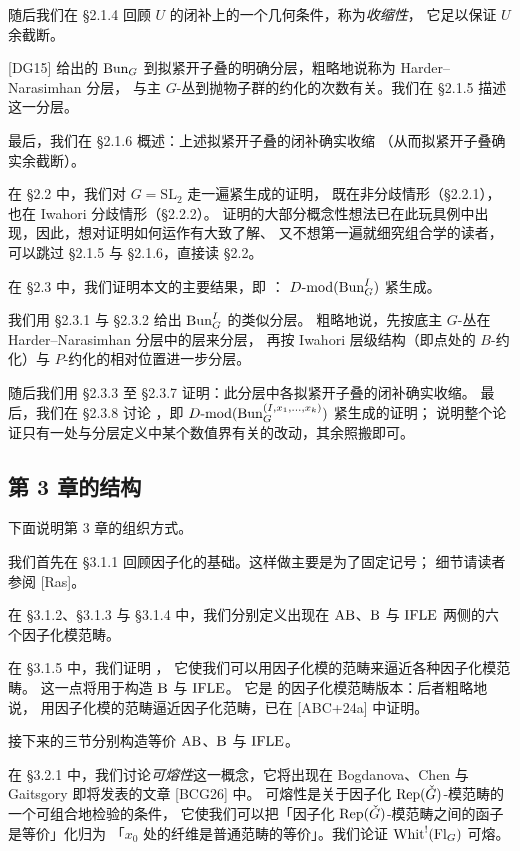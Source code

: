 随后我们在 §2.1.4 回顾 $U$ 的闭补上的一个几何条件，称为\emph{收缩性}，
它足以保证 $U$ 余截断。

[DG15] 给出的 $\mathrm{Bun}_G$ 到拟紧开子叠的明确分层，粗略地说称为 Harder–Narasimhan 分层，
与主 $G$-丛到抛物子群的约化的次数有关。我们在 §2.1.5 描述这一分层。

最后，我们在 §2.1.6 概述：上述拟紧开子叠的闭补确实收缩
（从而拟紧开子叠确实余截断）。

在 §2.2 中，我们对 $G=\mathrm{SL}_2$ 走一遍紧生成的证明，
既在非分歧情形（§2.2.1），也在 Iwahori 分歧情形（§2.2.2）。
证明的大部分概念性想法已在此玩具例中出现，因此，想对证明如何运作有大致了解、
又不想第一遍就细究组合学的读者，可以跳过 §2.1.5 与 §2.1.6，直接读 §2.2。

在 §2.3 中，我们证明本文的主要结果，即 ：
$D\text{-}\mathrm{mod}(\mathrm{Bun}^I_G)$ 紧生成。

我们用 §2.3.1 与 §2.3.2 给出 $\mathrm{Bun}^I_G$ 的类似分层。
粗略地说，先按底主 $G$-丛在 Harder–Narasimhan 分层中的层来分层，
再按 Iwahori 层级结构（即点处的 $B$-约化）与 $P$-约化的相对位置进一步分层。

随后我们用 §2.3.3 至 §2.3.7 证明：此分层中各拟紧开子叠的闭补确实收缩。
最后，我们在 §2.3.8 讨论 ，即
$D\text{-}\mathrm{mod}(\mathrm{Bun}^{(I,x_1,\dots,x_k)}_G)$ 紧生成的证明；
说明整个论证只有一处与分层定义中某个数值界有关的改动，其余照搬即可。

\subsection{第 3 章的结构}
\label{sec:1.2.2}

下面说明第 3 章的组织方式。

我们首先在 §3.1.1 回顾因子化的基础。这样做主要是为了固定记号；
细节请读者参阅 [Ras]。

在 §3.1.2、§3.1.3 与 §3.1.4 中，我们分别定义出现在 $\mathrm{AB}$、$\mathrm{B}$ 与 $\mathrm{IFLE}$
两侧的六个因子化模范畴。

在 §3.1.5 中，我们证明 ，
它使我们可以用因子化模的范畴来逼近各种因子化模范畴。
这一点将用于构造 $\mathrm{B}$ 与 $\mathrm{IFLE}$。
它是  的因子化模范畴版本：后者粗略地说，
用因子化模的范畴逼近因子化范畴，已在 [ABC+24a] 中证明。

接下来的三节分别构造等价 $\mathrm{AB}$、$\mathrm{B}$ 与 $\mathrm{IFLE}$。

在 §3.2.1 中，我们讨论\emph{可熔性}这一概念，它将出现在 Bogdanova、Chen 与 Gaitsgory
即将发表的文章 [BCG26] 中。
可熔性是关于因子化 $\mathrm{Rep}(\check{G})$-模范畴的一个可组合地检验的条件，
它使我们可以把「因子化 $\mathrm{Rep}(\check{G})$-模范畴之间的函子是等价」化归为
「$x_0$ 处的纤维是普通范畴的等价」。我们论证 $\mathrm{Whit}^{!}(\mathrm{Fl}_G)$ 可熔。

